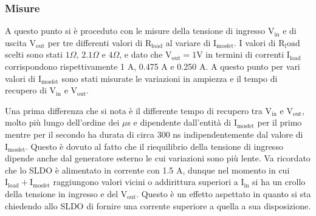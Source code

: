 \subsubsection{Misure}
A questo punto si è proceduto con le misure della tensione di ingresso $\mathrm{V_{in}}$ e di uscita $\mathrm{V_{out}}$ per tre differenti valori di $\mathrm{R_{load}}$ al variare di $\mathrm{I_{mosfet}}$. I valori di $\mathrm{R_load}$ scelti sono stati $1 \Omega$, $2.1 \Omega$ e $4 \Omega$, e dato che $\mathrm{V_{out}=1V}$ in termini di correnti  $\mathrm{I_{load}}$ corrispondono rispettivamente 1 A, 0.475 A e 0.250 A. A questo punto per vari valori di $\mathrm{I_{mosfet}}$ sono stati misurate le variazioni in ampiezza e il tempo di recupero di $\mathrm{V_{in}}$ e $\mathrm{V_{out}}$.

Una prima differenza che si nota è il differente tempo di recupero tra $\mathrm{V_{in}}$ e $\mathrm{V_{out}}$, molto più lungo dell'ordine dei $\mu$s e dipendente dall'entità di $\mathrm{I_{mosfet}}$ per il primo mentre per il secondo ha durata di circa 300 ns indipendentemente dal valore di $\mathrm{I_{mosfet}}$. 
Questo è dovuto al fatto che il riequilibrio della tensione di ingresso dipende anche dal generatore esterno le cui variazioni sono più lente.
Va ricordato che lo SLDO è alimentato in corrente con 1.5 A, dunque nel momento in cui $\mathrm{I_{load}+I_{mosfet}}$ raggiungono valori vicini o addirittura superiori  a $\mathrm{I_{in}}$ si ha un crollo della tensione in ingresso e del $\mathrm{V_{out}}$. Questo è un effetto aspettato in quanto si sta chiedendo allo SLDO di fornire una corrente superiore a quella a sua disposizione.


